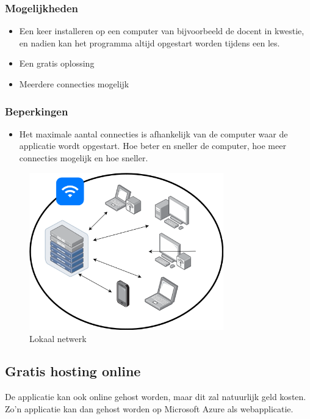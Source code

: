 \subsubsection{Mogelijkheden}
\begin{itemize}
    \item Een keer installeren op een computer van bijvoorbeeld de docent in kwestie, en nadien kan het programma altijd opgestart worden tijdens een les.
    \item Een gratis oplossing
    \item Meerdere connecties mogelijk
\end{itemize}
\subsubsection{Beperkingen}
\begin{itemize}
    \item Het maximale aantal connecties is afhankelijk van de computer waar de applicatie wordt opgestart. Hoe beter en sneller de computer, hoe meer connecties mogelijk en hoe sneller.
\end{itemize}

\begin{figure}
    \centering
    \includegraphics[width=0.75\textwidth]{./img/lokaal_netwerk}
    \caption{\label{fig:lokaal_netwerk} Lokaal netwerk}
\end{figure}

\subsection{Gratis hosting online}
De applicatie kan ook online gehost worden, maar dit zal natuurlijk geld kosten. Zo'n applicatie kan dan gehost worden op Microsoft Azure als webapplicatie.
